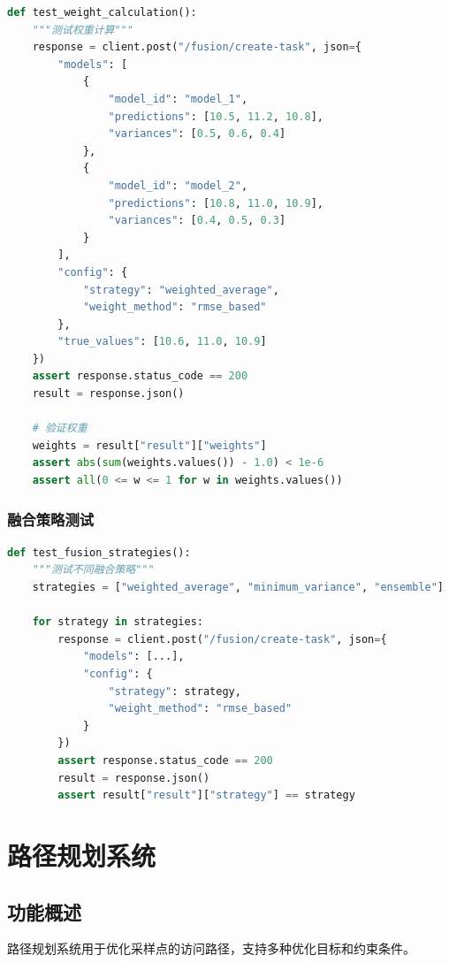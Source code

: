 \documentclass[12pt,a4paper,openany]{report}
\begin{document}
\begin{lstlisting}[language=Python, caption=权重计算测试]
def test_weight_calculation():
    """测试权重计算"""
    response = client.post("/fusion/create-task", json={
        "models": [
            {
                "model_id": "model_1",
                "predictions": [10.5, 11.2, 10.8],
                "variances": [0.5, 0.6, 0.4]
            },
            {
                "model_id": "model_2",
                "predictions": [10.8, 11.0, 10.9],
                "variances": [0.4, 0.5, 0.3]
            }
        ],
        "config": {
            "strategy": "weighted_average",
            "weight_method": "rmse_based"
        },
        "true_values": [10.6, 11.0, 10.9]
    })
    assert response.status_code == 200
    result = response.json()

    # 验证权重
    weights = result["result"]["weights"]
    assert abs(sum(weights.values()) - 1.0) < 1e-6
    assert all(0 <= w <= 1 for w in weights.values())
\end{lstlisting}

\subsubsection{融合策略测试}

\begin{lstlisting}[language=Python, caption=融合策略测试]
def test_fusion_strategies():
    """测试不同融合策略"""
    strategies = ["weighted_average", "minimum_variance", "ensemble"]

    for strategy in strategies:
        response = client.post("/fusion/create-task", json={
            "models": [...],
            "config": {
                "strategy": strategy,
                "weight_method": "rmse_based"
            }
        })
        assert response.status_code == 200
        result = response.json()
        assert result["result"]["strategy"] == strategy
\end{lstlisting}

\section{路径规划系统}

\subsection{功能概述}

路径规划系统用于优化采样点的访问路径，支持多种优化目标和约束条件。
\end{document}
